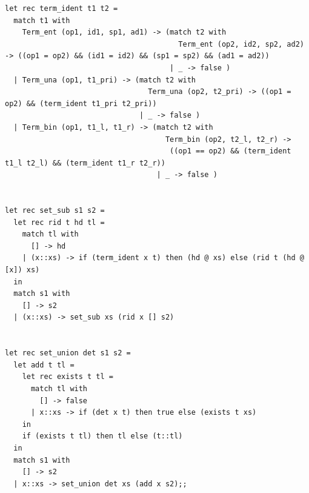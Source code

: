 \documentclass[12pt]{article}
\begin{document}
\begin{tiny}
\begin{verbatim}
let rec term_ident t1 t2 =
  match t1 with
    Term_ent (op1, id1, sp1, ad1) -> (match t2 with
                                        Term_ent (op2, id2, sp2, ad2) -> ((op1 = op2) && (id1 = id2) && (sp1 = sp2) && (ad1 = ad2))
                                      | _ -> false )
  | Term_una (op1, t1_pri) -> (match t2 with
                                 Term_una (op2, t2_pri) -> ((op1 = op2) && (term_ident t1_pri t2_pri))
                               | _ -> false )
  | Term_bin (op1, t1_l, t1_r) -> (match t2 with
                                     Term_bin (op2, t2_l, t2_r) ->
                                      ((op1 == op2) && (term_ident t1_l t2_l) && (term_ident t1_r t2_r))
                                   | _ -> false )


let rec set_sub s1 s2 =
  let rec rid t hd tl =
    match tl with
      [] -> hd
    | (x::xs) -> if (term_ident x t) then (hd @ xs) else (rid t (hd @ [x]) xs)
  in
  match s1 with
    [] -> s2
  | (x::xs) -> set_sub xs (rid x [] s2)


let rec set_union det s1 s2 =
  let add t tl =
    let rec exists t tl =
      match tl with
        [] -> false
      | x::xs -> if (det x t) then true else (exists t xs)
    in
    if (exists t tl) then tl else (t::tl)
  in
  match s1 with
    [] -> s2
  | x::xs -> set_union det xs (add x s2);;
\end{verbatim}
\end{tiny}
\end{document}
